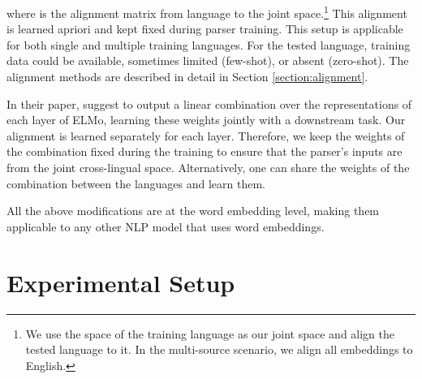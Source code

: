 \documentclass[11pt,a4paper]{article}
\newcommand{\secref}[1]{Section \ref{#1}}
\begin{document}
where  is the alignment matrix from language  to the joint space.\footnote{We use the space of the training language as our joint space and align the tested language to it. In the multi-source scenario, we align all embeddings to English.} This alignment is learned apriori and kept fixed during parser training. This setup is applicable for both single and multiple training languages. For the tested language, training data could be available, sometimes limited (few-shot), or absent (zero-shot). The alignment methods are described in detail in \secref{section:alignment}. 


In their paper, \citet{peters_deep_2018} suggest to output a linear combination over the representations of each layer of ELMo, learning these weights jointly with a downstream task. Our alignment is learned separately for each layer. Therefore, we keep the weights of the combination fixed during the training to ensure that the parser's inputs are from the joint cross-lingual space. 
Alternatively, one can share the weights of the combination between the languages and learn them.


All the above modifications are at the word embedding level, making them applicable to any other NLP model that uses word embeddings. 
 

\section{Experimental Setup}
\end{document}
